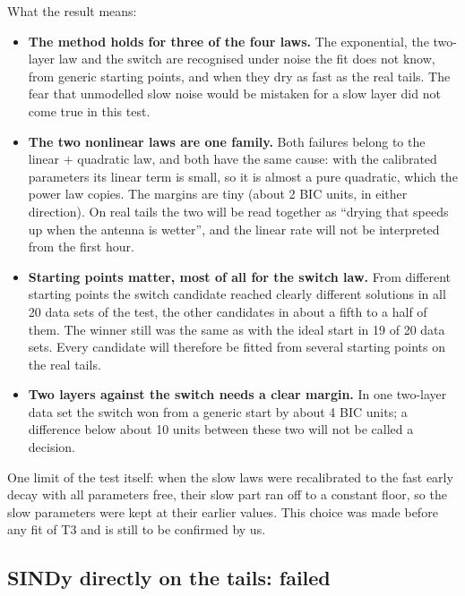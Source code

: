 \documentclass[11pt,a4paper]{article}
\begin{document}
What the result means:
\begin{itemize}
\item \textbf{The method holds for three of the four laws.} The exponential, the two-layer law and the switch are
recognised under noise the fit does not know, from generic starting points, and when they dry as fast as the real
tails. The fear that unmodelled slow noise would be mistaken for a slow layer did not come true in this test.
\item \textbf{The two nonlinear laws are one family.} Both failures belong to the linear + quadratic law, and both
have the same cause: with the calibrated parameters its linear term is small, so it is almost a pure quadratic, which
the power law copies. The margins are tiny (about 2 BIC units, in either direction). On real tails the two will be
read together as ``drying that speeds up when the antenna is wetter'', and the linear rate will not be interpreted
from the first hour.
\item \textbf{Starting points matter, most of all for the switch law.} From different starting points the switch
candidate reached clearly different solutions in all 20 data sets of the test, the other candidates in about a fifth to
a half of them. The winner still was the same as with the ideal start in 19 of 20 data sets. Every candidate will
therefore be fitted from several starting points on the real tails.
\item \textbf{Two layers against the switch needs a clear margin.} In one two-layer data set the switch won from a
generic start by about 4 BIC units; a difference below about 10 units between these two will not be called a
decision.
\end{itemize}
One limit of the test itself: when the slow laws were recalibrated to the fast early decay with all parameters free,
their slow part ran off to a constant floor, so the slow parameters were kept at their earlier values. This choice was
made before any fit of T3 and is still to be confirmed by us.

\subsection{SINDy directly on the tails: failed}
\label{sec:sindy}
\end{document}
